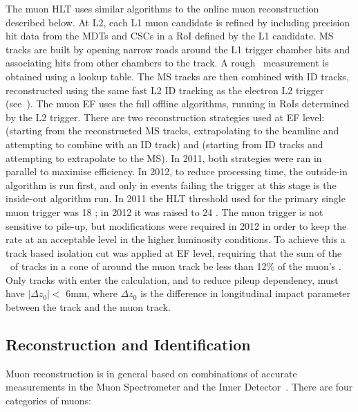 The muon HLT uses similar algorithms to the online muon reconstruction described
below. At L2, each L1 muon candidate is refined by including precision hit data
from the MDTs and CSCs in a RoI defined by the L1 candidate. MS tracks are
built by opening narrow roads around the L1 trigger chamber hits and associating
hits from other chambers to the track. A rough \pt\ measurement is obtained
using a lookup table. The MS tracks are then combined with ID tracks,
reconstructed using the same fast L2 ID tracking as the electron L2 trigger
(see~). The muon EF uses the full offline algorithms,
running in RoIs determined by the L2 trigger. There are two reconstruction
strategies used at EF level:  (starting from the reconstructed
MS tracks, extrapolating to the beamline and attempting to combine with an ID
track) and  (starting from ID tracks and attempting to
extrapolate to the MS). In 2011, both strategies were ran in parallel to
maximise efficiency. In 2012, to reduce processing time, the outside-in
algorithm is run first, and only in events failing the trigger at this stage is
the inside-out algorithm run. In 2011 the HLT threshold used for the primary
single muon trigger was 18 \GeV; in 2012 it was raised to 24 \GeV. The muon
trigger is not sensitive to pile-up, but modifications were required in 2012 in
order to keep the rate at an acceptable level in the higher luminosity
conditions. To achieve this a track based isolation cut was applied at EF level,
requiring that the sum of the \pt\ of tracks in a cone of  around
the muon track be less than 12\% of the muon's \pt. Only tracks with 
enter the calculation, and to reduce pileup dependency, must have $|\Delta
z_{0}| <$ 6mm, where $\Delta z_{0}$ is the difference in longitudinal impact
parameter between the track and the muon track.

\subsection{Reconstruction and Identification}
\label{sec:reco-el-reco}

Muon reconstruction is in general based on combinations of accurate measurements
in the Muon Spectrometer and the Inner Detector~\cite{ATLAS-CONF-2010-064,ATLAS-CONF-2011-063}. There are four categories of
muons:

